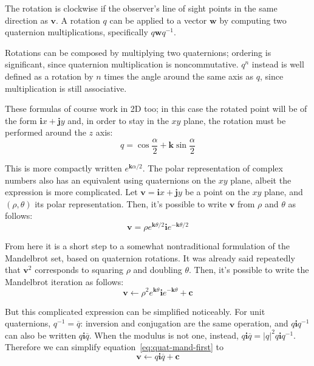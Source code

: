 \documentclass{article}
\let\vec\mathbf
\let\bar\overline
\begin{document}
The rotation is clockwise if the observer's line of sight points in the
same direction as $\vec{v}$.  A rotation $q$ can be applied to a vector
$\vec{w}$ by computing two quaternion multiplications, specifically
$q\vec{w}q^{-1}$.

Rotations can be composed by multiplying two quaternions; ordering is
significant, since quaternion multiplication is noncommutative.  $q^n$
instead is well defined as a rotation by $n$ times the angle around the
same axis as $q$, since multiplication is still associative.

These formulas of course work in 2D too; in this case the rotated
point will be of the form $\vec{i}x+\vec{j}y$ and, in order to stay in
the $xy$ plane, the rotation must be performed around the $z$ axis:
\begin{equation*}
q = \cos \frac\alpha2 + \vec{k} \sin \frac\alpha2
\end{equation*}

\noindent
This is more compactly written $e^{\vec{k}\alpha/2}$.  The polar
representation of complex numbers also has an equivalent using
quaternions on the $xy$ plane, albeit the expression is more
complicated.  Let $\vec{v}=\vec{i}x+\vec{j}y$ be a point on the $xy$
plane, and $(\rho,\theta)$ its polar representation.  Then, it's
possible to write $\vec{v}$ from $\rho$ and $\theta$ as follows:
\begin{equation*}
\label{eq:quat-v}
\vec{v}=\rho e^{\vec{k}\theta/2} \vec{i} e^{-\vec{k}\theta/2}
\end{equation*}

From here it is a short step to a somewhat nontraditional formulation
of the Mandelbrot set, based on quaternion rotations.  It was already
said repeatedly that $\vec{v}^2$ corresponds to squaring $\rho$ and
doubling $\theta$.  Then, it's possible to write the Mandelbrot
iteration as follows:
\begin{equation}
  \label{eq:quat-mand-first}
\vec{v} \leftarrow \rho^2 e^{\vec{k}\theta} \vec{i} e^{-\vec{k}\theta}+\vec{c}
\end{equation}

But this complicated expression can be simplified noticeably.  For unit
quaternions, $q^{-1}=\bar q$: inversion and conjugation are the same
operation, and $q\vec{i}q^{-1}$ can also be written $q\vec{i}\bar
q$.  When the modulus is not one, instead, $q\vec{i}\bar q = |q|^2
q\vec{i}q^{-1}$.  Therefore we can simplify equation~\ref{eq:quat-mand-first}
to
\begin{equation*}
\vec{v} \leftarrow q \vec{i} \bar q+\vec{c}
\end{equation*}
  
\end{document}
